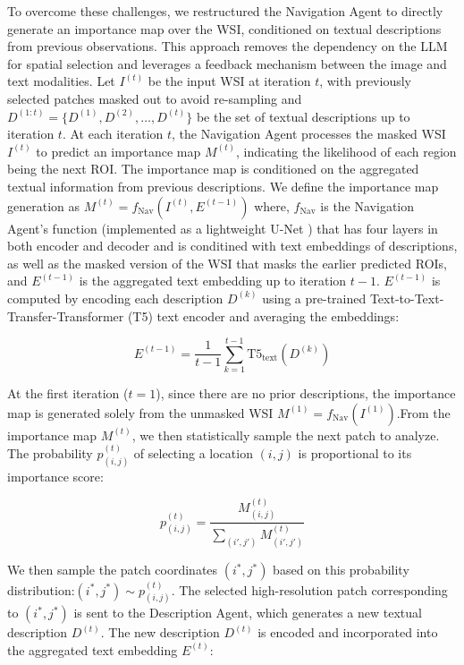 To overcome these challenges, we restructured the Navigation Agent to directly generate an importance map over the WSI, conditioned on textual descriptions from previous observations. This approach removes the dependency on the LLM for spatial selection and leverages a feedback mechanism between the image and text modalities. Let $I^{(t)}$ be the input WSI at iteration $t$, with previously selected patches masked out to avoid re-sampling and $D^{(1:t)} = \{D^{(1)}, D^{(2)}, \dots, D^{(t)}\}$ be the set of textual descriptions up to iteration $t$. At each iteration $t$, the Navigation Agent processes the masked WSI $I^{(t)}$ to predict an importance map $M^{(t)}$, indicating the likelihood of each region being the next ROI. The importance map is conditioned on the aggregated textual information from previous descriptions. We define the importance map generation as $M^{(t)} = f_{\text{Nav}} \left( I^{(t)}, E^{(t-1)} \right)$ where, $f_{\text{Nav}}$ is the Navigation Agent's function (implemented as a lightweight U-Net \cite{ronneberger2015u}) that has four layers in both encoder and decoder and is conditined with text embeddings of descriptions, as well as the masked version of the WSI that masks the earlier predicted ROIs, and $E^{(t-1)}$ is the aggregated text embedding up to iteration $t - 1$. $E^{(t-1)}$ is computed by encoding each description $D^{(k)}$ using a pre-trained Text-to-Text-Transfer-Transformer (T5) text encoder \cite{raffel2020exploring} and averaging the embeddings:

\begin{equation}
    E^{(t-1)} = \frac{1}{t-1} \sum_{k=1}^{t-1} \text{T5}_{\text{text}}(D^{(k)})
\end{equation}

At the first iteration ($t = 1$), since there are no prior descriptions, the importance map is generated solely from the unmasked WSI $M^{(1)} = f_{\text{Nav}} \left( I^{(1)} \right)$.From the importance map $M^{(t)}$, we then statistically sample the next patch to analyze. The probability $p_{(i,j)}^{(t)}$ of selecting a location $(i, j)$ is proportional to its importance score:

\begin{equation}
    p_{(i,j)}^{(t)} = \frac{M_{(i,j)}^{(t)}}{\sum\limits_{(i', j')} M_{(i', j')}^{(t)}}
\end{equation}

We then sample the patch coordinates $(i^{*}, j^{*})$ based on this probability distribution:$(i^{*}, j^{*}) \sim p_{(i,j)}^{(t)}$. The selected high-resolution patch corresponding to $(i^{*}, j^{*})$ is sent to the Description Agent, which generates a new textual description $D^{(t)}$. The new description $D^{(t)}$ is encoded and incorporated into the aggregated text embedding $E^{(t)}$:

